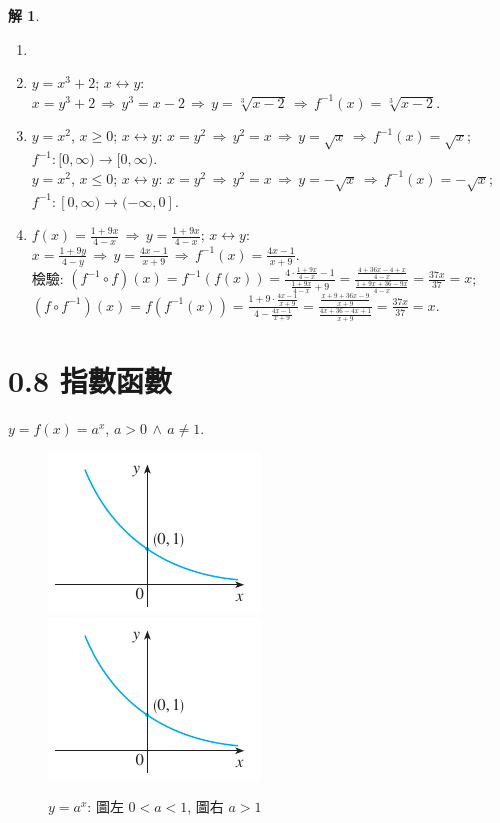 \documentclass[12pt]{extarticle}
\newcommand{\ds}{\displaystyle}
\newcommand{\ie}{\,\Longrightarrow\,}
\theoremstyle{definition}
\newtheorem*{sol}{解}
\begin{document}
\begin{sol} 
  \begin{enumerate}\setlength\itemsep{0em}
    \item[]
    \item $y = x^3 + 2$; $x\longleftrightarrow y$: $x = y^3 + 2 \ie y^3 = x - 2 \ie y = \sqrt[3]{x - 2} \ie f^{-1}(x) = \sqrt[3]{x - 2}$.  
    \item $y = x^2$, $x\geqslant 0$;  $x\longleftrightarrow y$: $x = y^2 \ie y^2 = x \ie y = \sqrt{x} \ie f^{-1}(x) = \sqrt{x}$; $f^{-1}:[0, \infty)\to [0, \infty)$. \\$y = x^2$, $x\leqslant 0$;  $x\longleftrightarrow y$: $x = y^2 \ie y^2 = x \ie y = -\sqrt{x} \ie f^{-1}(x) = -\sqrt{x}$; $f^{-1}:[0, \infty)\to (-\infty, 0]$. 
    \item $\ds f(x) = \frac{1 + 9x}{4 - x} \ie y = \frac{1 + 9x}{4 - x}$; $x\longleftrightarrow y$: $\ds x = \frac{1 + 9 y}{4 - y} \ie y = \frac{4 x - 1}{x + 9} \ie f^{-1}(x) = \frac{4 x - 1}{x + 9}$. \\
      檢驗: $\ds (f^{-1}\circ f)(x) = f^{-1}(f(x)) = \frac{4\cdot\frac{1 + 9x}{4 - x} - 1}{\frac{1 + 9x}{4 - x} + 9} = \frac{\frac{4 + 36 x - 4 + x}{4 - x}}{\frac{1 + 9x + 36 - 9x}{4 - x}} = \frac{37 x}{37} = x$; $\ds(f\circ f^{-1})(x) = f(f^{-1}(x)) = \frac{1 + 9\cdot\frac{4x - 1}{x + 9}}{4 - \frac{4 x - 1}{x + 9}} = \frac{\frac{x + 9 + 36 x - 9}{x + 9}}{\frac{4 x + 36 - 4x + 1}{x + 9}} = \frac{37x}{37} = x$. 
  \end{enumerate}
\end{sol}

\section*{0.8 指數函數}

$y = f(x) = a^x$, $a > 0\,\wedge\, a\not=1$. 

\begin{figure}[!htbp]
  \centering
  \includegraphics[width=.3\textwidth,page=1]{fig/power.pdf}\hspace{2cm}
  \includegraphics[width=.3\textwidth,page=2]{fig/power.pdf}
  \caption{$y = a^x$: 圖左 $0 < a < 1$, 圖右 $a > 1$}
\end{figure}
\end{document}
